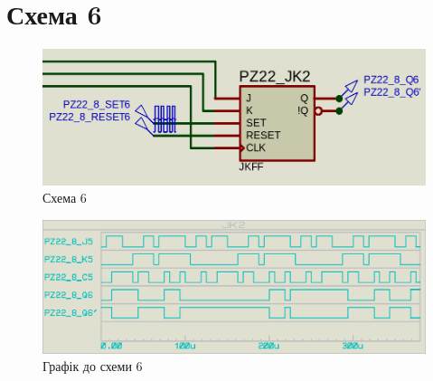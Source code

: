 \documentclass{article}
\begin{document}
\begin{normalsize}
\begin{figure}[H]
	\end{figure}

	\section*{Схема 6}	
	\begin{figure}[H]
		\centering
		\includegraphics[scale=0.25]{s6}	
		\caption{Схема 6}
	\end{figure}
	
	\begin{figure}[H]
		\centering
		\includegraphics[scale=0.25]{g6}	
		\caption{Графік до схеми 6}
	\end{figure}


\end{normalsize}
\end{document}
